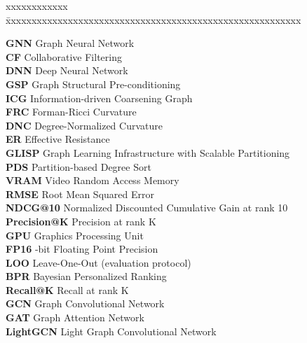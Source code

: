 \documentclass[BTech]{iiitdmdiss}
\begin{document}
\noindent
\begin{tabbing}
xxxxxxxxxxxx \= xxxxxxxxxxxxxxxxxxxxxxxxxxxxxxxxxxxxxxxxxxxxxxxxxxxxxxxxx \kill

\textbf{GNN} \> Graph Neural Network \\

\textbf{CF} \> Collaborative Filtering \\

\textbf{DNN} \> Deep Neural Network \\

\textbf{GSP} \> Graph Structural Pre-conditioning \\

\textbf{ICG} \> Information-driven Coarsening Graph \\

\textbf{FRC} \> Forman-Ricci Curvature \\

\textbf{DNC} \> Degree-Normalized Curvature \\

\textbf{ER} \> Effective Resistance \\

\textbf{GLISP} \> Graph Learning Infrastructure with Scalable Partitioning \\

\textbf{PDS} \> Partition-based Degree Sort \\

\textbf{VRAM} \> Video Random Access Memory \\

\textbf{RMSE} \> Root Mean Squared Error \\

\textbf{NDCG@10} \> Normalized Discounted Cumulative Gain at rank 10 \\

\textbf{Precision@K} \> Precision at rank K \\

\textbf{GPU} \> Graphics Processing Unit \\

\textbf{FP16} -bit Floating Point Precision \\

\textbf{LOO} \> Leave-One-Out (evaluation protocol) \\

\textbf{BPR} \> Bayesian Personalized Ranking \\

\textbf{Recall@K} \> Recall at rank K \\

\textbf{GCN} \> Graph Convolutional Network \\

\textbf{GAT} \> Graph Attention Network \\

\textbf{LightGCN} \> Light Graph Convolutional Network \\


\end{tabbing}
\end{document}
